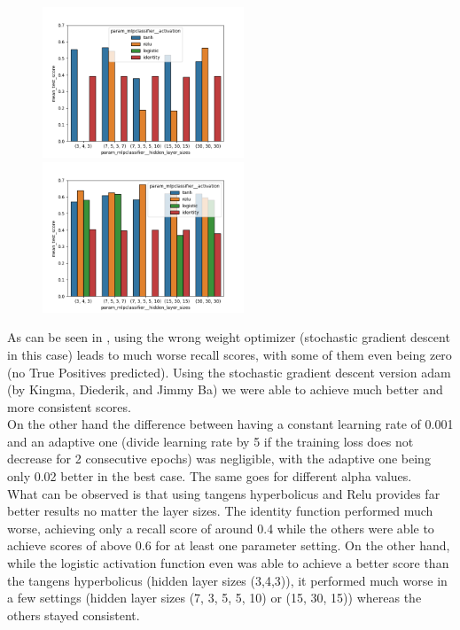 \begin{figure}
\begin{floatrow}
    {\includegraphics[width=6cm]{onlineshop/plots/mlp_solver_comparisonsgd.png}\label{fig:mlp_sgd}}
    {\includegraphics[width=6cm]{onlineshop/plots/mlp_solver_comparisonadam.png}\label{fig:mlp_adam}}
\end{floatrow}
\end{figure}
As can be seen in , using the wrong weight optimizer (stochastic gradient descent in this case) leads to much worse recall scores, with some of them even being zero (no True Positives predicted). Using the stochastic gradient descent version adam (by Kingma, Diederik, and Jimmy Ba) we were able to achieve much better and more consistent scores.\\
\newline
On the other hand the difference between having a constant learning rate of 0.001 and an adaptive one (divide learning rate by 5 if the training loss does not decrease for 2 consecutive epochs) was negligible, with the adaptive one being only 0.02 better in the best case. The same goes for different alpha values. \\
\newline
What can be observed is that using tangens hyperbolicus and Relu provides far better results no matter the layer sizes. The identity function performed much worse, achieving only a recall score of around 0.4 while the others were able to achieve scores of above 0.6 for at least one parameter setting. On the other hand, while the logistic activation function even was able to achieve a better score than the tangens hyperbolicus (hidden layer sizes (3,4,3)), it performed much worse in a few settings (hidden layer sizes (7, 3, 5, 5, 10) or (15, 30, 15)) whereas the others stayed consistent. \\
